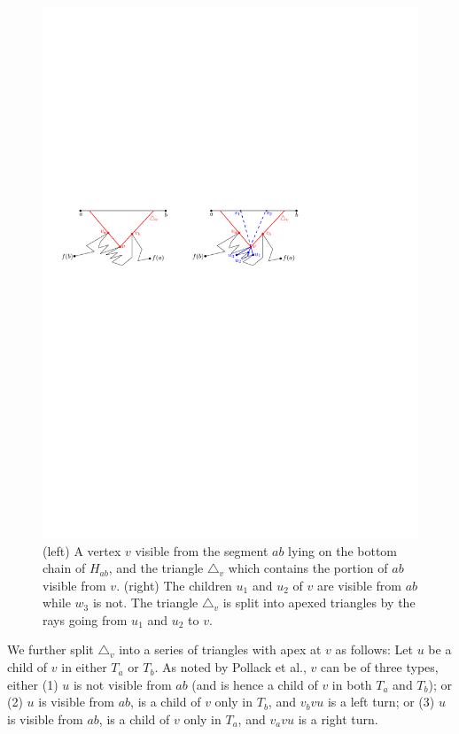 \documentclass[a4paper,UKenglish]{lipics}
\begin{document}
\begin{figure}[tb]
\centering
\includegraphics{img/HourglassCover.pdf}

\caption{\small (left) A vertex $v$ visible from the segment $ab$ lying on the bottom chain of $H_{ab}$, and the triangle $\triangle_v$ which contains the portion of $ab$ visible from $v$. (right) The children $u_1$ and $u_2$ of $v$ are visible from $ab$ while $w_3$ is not. The triangle  $\triangle_v$ is split into apexed triangles by the rays going from $u_1$ and $u_2$ to $v$. }
\label{fig:Hourglass Cover}
\end{figure}

We further split $\triangle_v$ into a series of triangles with apex at $v$ as follows: 
Let $u$ be a child of $v$ in either $T_a$ or $T_b$. As noted by Pollack et al., $v$ can be of three types, either (1) $u$ is not visible from $ab$ (and is hence a child of $v$ in both $T_a$ and $T_b$); or (2) $u$ is visible from $ab$, is a child of $v$ only in $T_b$, and $v_b v u$ is a left turn; or (3) $u$ is visible from $ab$, is a child of $v$ only in $T_a$, and $v_a v u$ is a right turn.
\end{document}
